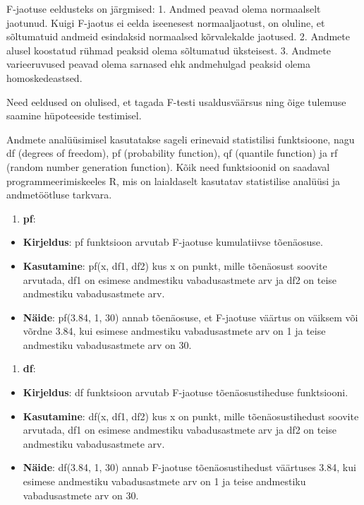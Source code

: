 \documentclass[
]{book}
\providecommand{\tightlist}{%
  \setlength{\itemsep}{0pt}\setlength{\parskip}{0pt}}
\begin{document}
F-jaotuse eeldusteks on järgmised:
1. Andmed peavad olema normaalselt jaotunud. Kuigi F-jaotus ei eelda iseenesest normaaljaotust, on oluline, et sõltumatuid andmeid esindaksid normaalsed kõrvalekalde jaotused.
2. Andmete alusel koostatud rühmad peaksid olema sõltumatud üksteisest.
3. Andmete varieeruvused peavad olema sarnased ehk andmehulgad peaksid olema homoskedeastsed.

Need eeldused on olulised, et tagada F-testi usaldusväärsus ning õige tulemuse saamine hüpoteeside testimisel.

Andmete analüüsimisel kasutatakse sageli erinevaid statistilisi funktsioone, nagu df (degrees of freedom), pf (probability function), qf (quantile function) ja rf (random number generation function). Kõik need funktsioonid on saadaval programmeerimiskeeles R, mis on laialdaselt kasutatav statistilise analüüsi ja andmetöötluse tarkvara.

\begin{enumerate}
\def\labelenumi{\arabic{enumi}.}
\tightlist
\item
  \textbf{pf}:
\end{enumerate}

\begin{itemize}
\tightlist
\item
  \textbf{Kirjeldus}: pf funktsioon arvutab F-jaotuse kumulatiivse tõenäosuse.
\item
  \textbf{Kasutamine}: pf(x, df1, df2) kus x on punkt, mille tõenäosust soovite arvutada, df1 on esimese andmestiku vabadusastmete arv ja df2 on teise andmestiku vabadusastmete arv.
\item
  \textbf{Näide}: pf(3.84, 1, 30) annab tõenäosuse, et F-jaotuse väärtus on väiksem või võrdne 3.84, kui esimese andmestiku vabadusastmete arv on 1 ja teise andmestiku vabadusastmete arv on 30.
\end{itemize}

\begin{enumerate}
\def\labelenumi{\arabic{enumi}.}
\setcounter{enumi}{1}
\tightlist
\item
  \textbf{df}:
\end{enumerate}

\begin{itemize}
\tightlist
\item
  \textbf{Kirjeldus}: df funktsioon arvutab F-jaotuse tõenäosustiheduse funktsiooni.
\item
  \textbf{Kasutamine}: df(x, df1, df2) kus x on punkt, mille tõenäosustihedust soovite arvutada, df1 on esimese andmestiku vabadusastmete arv ja df2 on teise andmestiku vabadusastmete arv.
\item
  \textbf{Näide}: df(3.84, 1, 30) annab F-jaotuse tõenäosustihedust väärtuses 3.84, kui esimese andmestiku vabadusastmete arv on 1 ja teise andmestiku vabadusastmete arv on 30.
\end{itemize}
\end{document}
